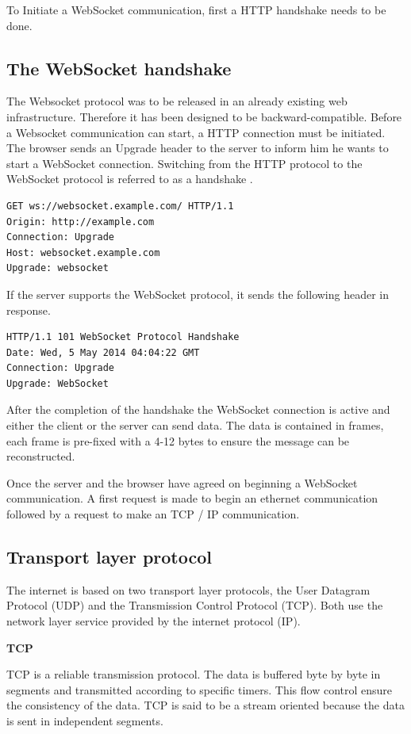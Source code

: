 To Initiate a WebSocket communication, first a HTTP handshake needs to be done.

\subsection{The WebSocket handshake}

The Websocket protocol was to be released in an already existing web
infrastructure. Therefore it has been designed to be backward-compatible. Before
a Websocket communication can start, a HTTP connection must be initiated. The
browser sends an Upgrade header to the server to inform him he wants to start a
WebSocket connection. Switching from the HTTP protocol to the WebSocket
protocol is referred to as a handshake \citep{Reference12}.

\begin{verbatim}
GET ws://websocket.example.com/ HTTP/1.1
Origin: http://example.com
Connection: Upgrade
Host: websocket.example.com
Upgrade: websocket
\end{verbatim}

If the server supports the WebSocket protocol, it sends the following header in
response.

\begin{verbatim}
HTTP/1.1 101 WebSocket Protocol Handshake
Date: Wed, 5 May 2014 04:04:22 GMT
Connection: Upgrade
Upgrade: WebSocket
\end{verbatim}

After the completion of the handshake the WebSocket connection is active and
either the client or the server can send data. The data is contained in frames,
each frame is pre-fixed with a 4-12 bytes to ensure the message can be
reconstructed. 

Once the server and the browser have agreed on beginning a WebSocket
communication. A first request is made to begin an ethernet communication
followed by a request to make an TCP / IP communication.

\subsection{Transport layer protocol}

The internet is based on two transport layer protocols, the User Datagram
Protocol (UDP) and the Transmission Control Protocol (TCP). Both use the
network layer service provided by the internet protocol (IP). 

\textbf{TCP}

TCP is a reliable transmission protocol. The data is buffered byte by byte in
segments and transmitted according to specific timers. This flow control ensure
the consistency of the data. TCP is said to be a stream oriented because the
data is sent in independent segments.


